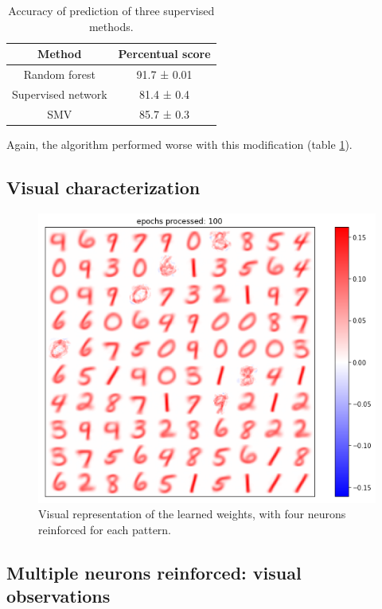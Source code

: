 \documentclass[a4paper]{report}
\begin{document}
\begin{table}[hb!]
  \begin{center}
    \begin{tabular}{c|c} %
      \textbf{Method} & \textbf{Percentual score}\\
      \hline
      Random forest & 91.7  ± 0.01\\
      Supervised network & 81.4 ± 0.4\\
      SMV & 85.7 ± 0.3\\
    \end{tabular}
  \end{center}
  \caption{Accuracy of prediction of three supervised methods.}
  \label{4tab}
\end{table}

Again, the algorithm performed worse with this modification (table \ref{4tab}).

\subsection{Visual characterization}

\begin{figure} [H]
\centering
\includegraphics [width=12cm ] {h/quattrocinque.png}
\caption{Visual representation of the learned weights, with four neurons reinforced for each pattern.}
\label{multiple}
\end{figure}

\subsection{Multiple neurons reinforced: visual observations}
\end{document}
